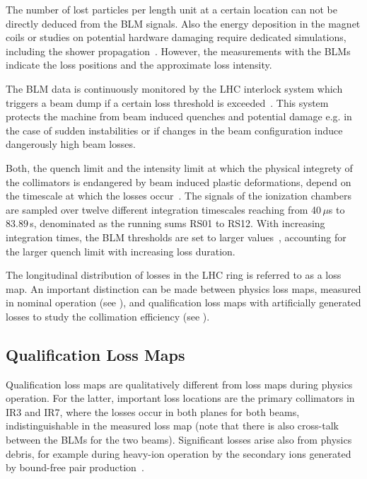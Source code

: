The number of lost particles per length unit at a certain location can not be directly deduced from the BLM signals. Also the energy deposition in the magnet coils or studies on potential hardware damaging require dedicated simulations, including the shower propagation~\cite{}. However, the measurements with the BLMs indicate the loss positions and the approximate loss intensity. 

The BLM data is continuously monitored by the LHC interlock system which triggers a beam dump if a certain loss threshold is exceeded~\cite{guaglio2005reliability}. This system protects the machine from beam induced quenches and potential damage e.g. in the case of sudden instabilities or if changes in the beam configuration induce dangerously high beam losses. 

Both, the quench limit and the intensity limit at which the physical integrety of the collimators is endangered by beam induced plastic deformations, depend on the timescale at which the losses occur~\cite{IPAC15:MOPRO043}. The signals of the ionization chambers are sampled over twelve different integration timescales reaching from 40\,$\mu$s to $83.89\,$s, denominated as the running sums RS01 to RS12. With increasing integration times, the BLM thresholds are set to larger values~\cite{}, accounting for the larger quench limit with increasing loss duration. 

The longitudinal distribution of losses in the LHC ring is referred to as a loss map. An important distinction can be made between physics loss maps, measured in nominal operation (see ), and qualification loss maps with artificially generated losses to study the collimation efficiency (see ). 








%
\subsection{Qualification Loss Maps}\label{chap:qualification_lossmaps  }

Qualification loss maps are qualitatively different from loss maps during physics operation. For the latter, important loss locations are the primary collimators in IR3 and IR7, where the losses occur in both planes for both beams, indistinguishable in the measured loss map (note that there is also cross-talk between the BLMs for the two beams). Significant losses arise also from physics debris, for example during heavy-ion operation by the secondary ions generated by bound-free pair production~\cite{PhysRevLett.99.144801}. 


